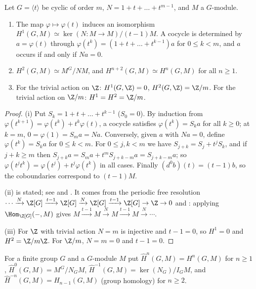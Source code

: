 \begin{theorem}\label{thm:cohomology:cyclic}
Let $G=\langle t\rangle$ be cyclic of order $m$, $N=1+t+\dots+t^{m-1}$, and $M$ a $G$-module.
\begin{enumerate}[label=(\roman*)]
\item The map $\varphi\mapsto\varphi(t)$ induces an isomorphism $H^1(G,M)\simeq\ker(N\colon M\to M)/(t-1)M$. A cocycle is determined by $a=\varphi(t)$ through
$\varphi(t^k)=(1+t+\dots+t^{k-1})a$ for $0\le k<m$, and $a$ occurs if and only if $Na=0$.
\item $H^2(G,M)\simeq M^G/NM$, and $H^{n+2}(G,M)\simeq H^n(G,M)$ for all $n\ge1$.
\item For the trivial action on $\Z$: $H^1(G,\Z)=0$, $H^2(G,\Z)=\Z/m$. For the trivial action on $\Z/m$: $H^1=H^2=\Z/m$.
\end{enumerate}
\end{theorem}

\begin{proof}
(i) Put $S_k=1+t+\dots+t^{k-1}$ ($S_0=0$). By induction from $\varphi(t^{k+1})=\varphi(t^k)+t^k\varphi(t)$, a cocycle satisfies $\varphi(t^k)=S_ka$ for all $k\ge0$; at
$k=m$, $0=\varphi(1)=S_ma=Na$. Conversely, given $a$ with $Na=0$, define $\varphi(t^k)=S_ka$ for $0\le k<m$. For $0\le j,k<m$ we have $S_{j+k}=S_j+t^jS_k$, and if
$j+k\ge m$ then $S_{j+k}a=S_ma+t^mS_{j+k-m}a=S_{j+k-m}a$; so $\varphi(t^jt^k)=\varphi(t^j)+t^j\varphi(t^k)$ in all cases. Finally $(d^0b)(t)=(t-1)b$, so the coboundaries
correspond to $(t-1)M$.

(ii) is stated; see \cite[Chapter VIII, Section 4]{SerreLocalFields} and \cite[Chapter IV, Section 8]{CasselsFrohlich}. It comes from the periodic free resolution
$\cdots\xrightarrow{N}\Z[G]\xrightarrow{t-1}\Z[G]\xrightarrow{N}\Z[G]\xrightarrow{t-1}\Z[G]\to\Z\to0$ and : applying $\Hom_{\Z[G]}(-,M)$ gives
$M\xrightarrow{t-1}M\xrightarrow{N}M\xrightarrow{t-1}M\xrightarrow{N}\cdots$.

(iii) For $\Z$ with trivial action $N=m$ is injective and $t-1=0$, so $H^1=0$ and $H^2=\Z/m\Z$. For $\Z/m$, $N=m=0$ and $t-1=0$.
\end{proof}

\begin{definition}\label{def:cohomology:tate}
For a finite group $G$ and a $G$-module $M$ put $\hat H^n(G,M)=H^n(G,M)$ for $n\ge1$, $\hat H^0(G,M)=M^G/N_GM$, $\hat H^{-1}(G,M)=\ker(N_G)/I_GM$, and
$\hat H^{-n}(G,M)=H_{n-1}(G,M)$ (group homology) for $n\ge2$.
\end{definition}

